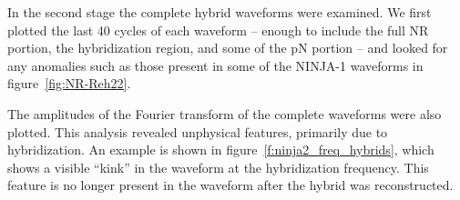 In the second stage the complete hybrid waveforms were examined.
We first plotted the last 40 cycles of each waveform -- enough to
include the full NR portion, the hybridization region, and some of the
pN portion -- and looked for any anomalies such as those present in
some of the NINJA-1 waveforms in figure~\ref{fig:NR-Reh22}.

The amplitudes of the Fourier transform of the complete waveforms were
also plotted.  This analysis revealed unphysical features, primarily
due to hybridization.  An example is shown in
figure~\ref{f:ninja2_freq_hybrids}, which shows a visible ``kink'' in
the waveform at the hybridization frequency.  This feature is no
longer present in the waveform after the hybrid was reconstructed.

